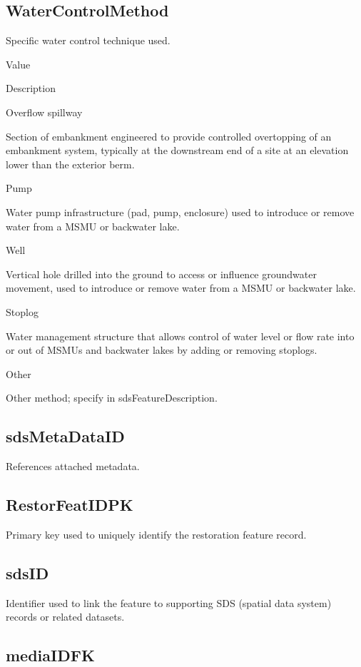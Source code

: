 \documentclass[
  letterpaper,
  DIV=11,
  numbers=noendperiod]{scrreprt}
\begin{document}
\subsection{WaterControlMethod}\label{watercontrolmethod}

Specific water control technique used.

Value

Description

Overflow spillway

Section of embankment engineered to provide controlled overtopping of an
embankment system, typically at the downstream end of a site at an
elevation lower than the exterior berm.

Pump

Water pump infrastructure (pad, pump, enclosure) used to introduce or
remove water from a MSMU or backwater lake.

Well

Vertical hole drilled into the ground to access or influence groundwater
movement, used to introduce or remove water from a MSMU or backwater
lake.

Stoplog

Water management structure that allows control of water level or flow
rate into or out of MSMUs and backwater lakes by adding or removing
stoplogs.

Other

Other method; specify in sdsFeatureDescription.

\subsection{sdsMetaDataID}\label{sdsmetadataid-8}

References attached metadata.

\subsection{RestorFeatIDPK}\label{restorfeatidpk-8}

Primary key used to uniquely identify the restoration feature record.

\subsection{sdsID}\label{sdsid-8}

Identifier used to link the feature to supporting SDS (spatial data
system) records or related datasets.

\subsection{mediaIDFK}\label{mediaidfk-8}
\end{document}
